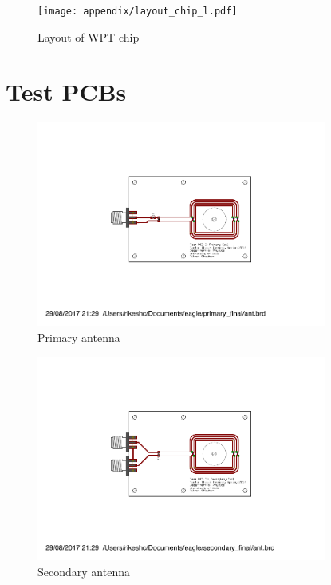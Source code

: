 \documentclass[UKenglish]{ifimaster}  %
\begin{document}
\begin{appendices}
\begin{figure} [!htbp]	%
 	\centering
  	\texttt{[image: appendix/layout\_chip\_l.pdf]} 
 	\caption{Layout of WPT chip} 
	\label{fig:appen_layout_chip} 
\end{figure}

\chapter{Test PCBs}

\begin{figure} [!htbp]	%
 	\centering
  	\includegraphics[width=0.85\textwidth]{appendix/pcb_pri.pdf} 
 	\caption{Primary antenna} 
	\label{fig:appen_primary} 
\end{figure}

\begin{figure} [!htbp]	%
 	\centering
  	\includegraphics[width=0.85\textwidth]{appendix/pcb_sec.pdf} 
 	\caption{Secondary antenna} 
	\label{fig:appen_secondary} 
\end{figure}


\end{appendices}
\end{document}
